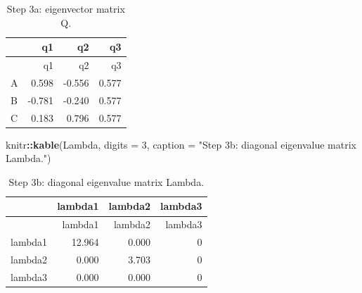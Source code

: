 \documentclass[
  english,
]{article}
\newenvironment{Shaded}{\begin{snugshade}}{\end{snugshade}}
\newcommand{\AttributeTok}[1]{\textcolor[rgb]{0.13,0.29,0.53}{#1}}
\newcommand{\ConstantTok}[1]{\textcolor[rgb]{0.56,0.35,0.01}{#1}}
\newcommand{\DecValTok}[1]{\textcolor[rgb]{0.00,0.00,0.81}{#1}}
\newcommand{\FunctionTok}[1]{\textcolor[rgb]{0.13,0.29,0.53}{\textbf{#1}}}
\newcommand{\NormalTok}[1]{#1}
\newcommand{\OtherTok}[1]{\textcolor[rgb]{0.56,0.35,0.01}{#1}}
\newcommand{\SpecialCharTok}[1]{\textcolor[rgb]{0.81,0.36,0.00}{\textbf{#1}}}
\newcommand{\StringTok}[1]{\textcolor[rgb]{0.31,0.60,0.02}{#1}}
\begin{document}
\begin{Shaded}
\end{Shaded}

\begin{longtable}[]{@{}lrrr@{}}
\caption{Step 3a: eigenvector matrix Q.}\tabularnewline
\toprule\noalign{}
& q1 & q2 & q3 \\
\midrule\noalign{}
\endfirsthead
\toprule\noalign{}
& q1 & q2 & q3 \\
\midrule\noalign{}
\endhead
\bottomrule\noalign{}
\endlastfoot
A & 0.598 & -0.556 & 0.577 \\
B & -0.781 & -0.240 & 0.577 \\
C & 0.183 & 0.796 & 0.577 \\
\end{longtable}

\begin{Shaded}
\begin{Highlighting}[]
\NormalTok{knitr}\SpecialCharTok{::}\FunctionTok{kable}\NormalTok{(Lambda, }\AttributeTok{digits =} \DecValTok{3}\NormalTok{, }\AttributeTok{caption =} \StringTok{"Step 3b: diagonal eigenvalue matrix Lambda."}\NormalTok{)}
\end{Highlighting}
\end{Shaded}

\begin{longtable}[]{@{}lrrr@{}}
\caption{Step 3b: diagonal eigenvalue matrix Lambda.}\tabularnewline
\toprule\noalign{}
& lambda1 & lambda2 & lambda3 \\
\midrule\noalign{}
\endfirsthead
\toprule\noalign{}
& lambda1 & lambda2 & lambda3 \\
\midrule\noalign{}
\endhead
\bottomrule\noalign{}
\endlastfoot
lambda1 & 12.964 & 0.000 & 0 \\
lambda2 & 0.000 & 3.703 & 0 \\
lambda3 & 0.000 & 0.000 & 0 \\
\end{longtable}
\end{document}
